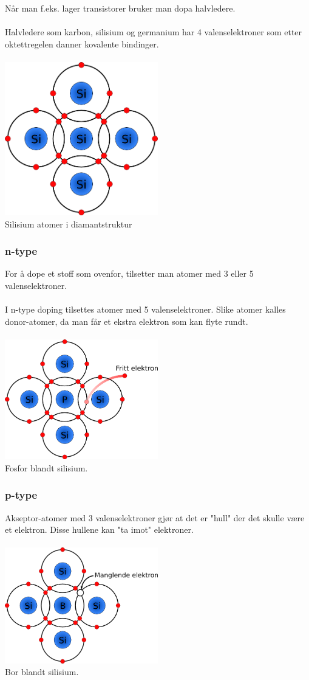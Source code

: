 Når man f.eks. lager transistorer bruker man dopa halvledere.
\\\\
Halvledere som karbon, silisium og germanium har 4 valenselektroner
som etter oktettregelen danner kovalente bindinger.
\\\\
\includegraphics[width=0.5\textwidth]{./img/kovalent-Si}
\\
Silisium atomer i diamantstruktur



\subsubsection{n-type}
For å dope et stoff som ovenfor,
tilsetter man atomer med 3 eller 5 valenselektroner.
\\\\
I n-type doping tilsettes atomer med 5 valenselektroner.
Slike atomer kalles donor-atomer,
da man får et ekstra elektron som kan flyte rundt.
\\\\
\includegraphics[width=0.5\textwidth]{./img/ntype}
\\
Fosfor blandt silisium.



\subsubsection{p-type}
Akseptor-atomer med 3 valenselektroner
gjør at det er "hull" der det skulle være et elektron.
Disse hullene kan "ta imot" elektroner.
\\\\
\includegraphics[width=0.5\textwidth]{./img/ptype}
\\
Bor blandt silisium.
